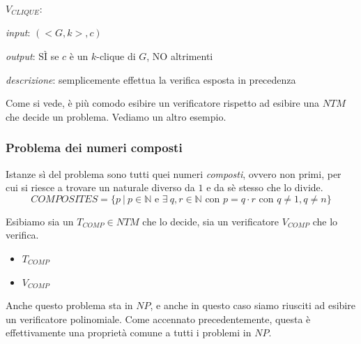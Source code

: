 $V_{CLIQUE}$:
\begin{description}
	\item \textit{input}: $(<G, k>, c)$
	\item \textit{output}: SÌ se $c$ è un $k$-clique di $G$, NO altrimenti
	\item \textit{descrizione}: semplicemente effettua la verifica esposta in precedenza
\end{description}

Come si vede, è più comodo esibire un verificatore rispetto ad esibire una $NTM$ che decide un problema. Vediamo un altro esempio.

\subsubsection{Problema dei numeri composti}
Istanze sì del problema sono tutti quei numeri \textit{composti}, ovvero non primi, per cui si riesce a trovare un naturale diverso da $1$ e da sè stesso che lo divide.
\[
	COMPOSITES = \{ p \ | \ p \in \mathbb{N} \text{ e } \exists \ q, r \in \mathbb{N} \text{ con } p = q \cdot r \text{ con } q \neq 1, q \neq n\}
\]

Esibiamo sia un $T_{COMP} \in NTM$ che lo decide, sia un verificatore $V_{COMP}$ che lo verifica.
\begin{itemize}
	\item $T_{COMP}$

	\item $V_{COMP}$
\end{itemize}
Anche questo problema sta in $NP$, e anche in questo caso siamo riusciti ad esibire un verificatore polinomiale. Come accennato precedentemente, questa è effettivamente una proprietà comune a tutti i problemi in $NP$.

